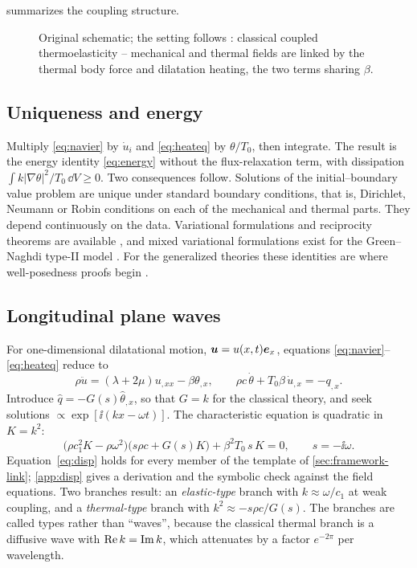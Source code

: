  summarizes the coupling structure.

\begin{figure}[t!]\centering\small

\caption{Original schematic; the setting follows \citep{Biot1956}: classical coupled thermoelasticity -- mechanical and thermal fields are linked by the thermal body force and dilatation heating, the two terms sharing $\beta$.}\label{fig:classical-coup}
\end{figure}

\subsection{Uniqueness and energy}
Multiply \eqref{eq:navier} by $\dot u_i$ and \eqref{eq:heateq} by $\theta/T_0$, then integrate. The result is the energy identity \eqref{eq:energy} without the flux-relaxation term, with dissipation $\int k|\nabla\theta|^2/T_0\,\dd V\ge0$. Two consequences follow. Solutions of the initial--boundary value problem are unique under standard boundary conditions, that is, Dirichlet, Neumann or Robin conditions on each of the mechanical and thermal parts. They depend continuously on the data. Variational formulations and reciprocity theorems are available \citep{Carlson1972,Nowacki1975}, and mixed variational formulations exist for the Green--Naghdi type-II model \citep{Marotti2013}. For the generalized theories these identities are where well-posedness proofs begin \citep{Chandrasekharaiah1996,Quintanilla2019}.

\subsection{Longitudinal plane waves}\label{sec:longitudinal}
For one-dimensional dilatational motion, $\bm u=u(x,t)\bm e_x$, equations \eqref{eq:navier}--\eqref{eq:heateq} reduce to
\begin{equation}
\rho\ddot u=(\lambda+2\mu)u_{,xx}-\beta\theta_{,x},\qquad \rho c\,\dot\theta+T_0\beta\,\dot u_{,x}=-q_{,x}.\label{eq:1d}
\end{equation}
Introduce $\hat q=-G(s)\hat\theta_{,x}$, so that $G=k$ for the classical theory, and seek solutions $\propto\exp[\ii(kx-\omega t)]$. The characteristic equation is quadratic in $K=k^2$:
\begin{equation}
\bigl(\rho c_1^2K-\rho\omega^2\bigr)\bigl(s\rho c+G(s)K\bigr)+\beta^2T_0\,s\,K=0,\qquad s=-\ii\omega. \label{eq:disp}
\end{equation}
Equation~\eqref{eq:disp} holds for every member of the template of \cref{sec:framework-link}; \cref{app:disp} gives a derivation and the symbolic check against the field equations. Two branches result: an \emph{elastic-type} branch with $k\approx\omega/c_1$ at weak coupling, and a \emph{thermal-type} branch with $k^2\approx-s\rho c/G(s)$. The branches are called types rather than ``waves'', because the classical thermal branch is a diffusive wave with $\operatorname{Re} k=\operatorname{Im} k$, which attenuates by a factor $e^{-2\pi}$ per wavelength.

